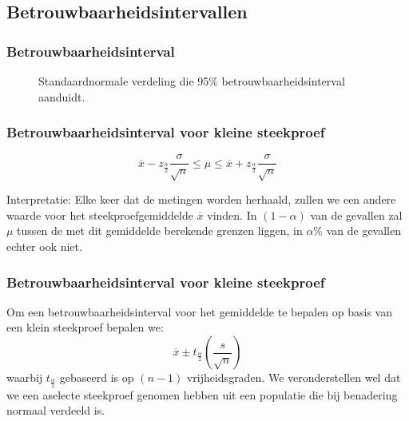 \subsection{Betrouwbaarheidsintervallen}

\begin{frame}
	\frametitle{Betrouwbaarheidsinterval}
	\begin{figure}[t]
		\centering
		\caption{Standaardnormale verdeling die 95\% betrouwbaarheidsinterval aanduidt.}
		\label{fig:verdelingStandaardnormaal}
	\end{figure}
\end{frame}

\begin{frame}
	\frametitle{Betrouwbaarheidsinterval voor kleine steekproef}

	
	\[  \overline{x} - z_{\frac{\alpha}{2}} \frac{\sigma}{\sqrt{n}} \leq \mu  \leq \overline{x} + z_{\frac{\alpha}{2}}\frac{\sigma}{\sqrt{n}}  \]
	
	Interpretatie: Elke keer dat de metingen worden herhaald, zullen we een andere waarde voor het steekproefgemiddelde $\overline{x}$ vinden. In $(1-\alpha)$ van de gevallen zal $\mu$ tussen de met dit gemiddelde berekende grenzen liggen, in $\alpha$\% van de gevallen echter ook niet. 
	
\end{frame}



\begin{frame}
	\frametitle{Betrouwbaarheidsinterval voor kleine steekproef}
	Om een betrouwbaarheidsinterval voor het gemiddelde te bepalen op basis van een klein steekproef bepalen we:
	\[ \overline{x} \pm t_{\frac{\alpha}{2}}(\frac{s}{\sqrt{n}}) \]
	waarbij $t_{\frac{\alpha}{2}}$ gebaseerd is op $(n-1)$ vrijheidsgraden. We veronderstellen wel dat we een aselecte steekproef genomen hebben uit
	een populatie die bij benadering normaal verdeeld is.
\end{frame}

